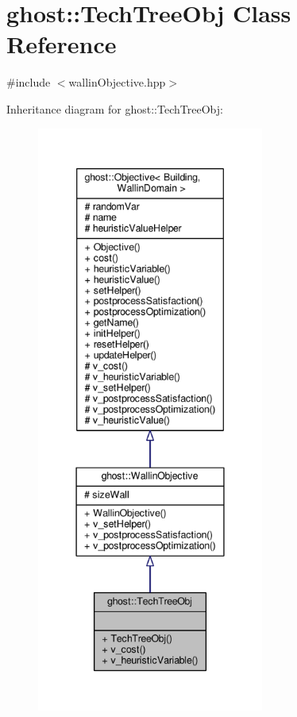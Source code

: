 \hypertarget{classghost_1_1TechTreeObj}{\section{ghost\-:\-:Tech\-Tree\-Obj Class Reference}
\label{classghost_1_1TechTreeObj}
}


{\ttfamily \#include $<$wallin\-Objective.\-hpp$>$}



Inheritance diagram for ghost\-:\-:Tech\-Tree\-Obj\-:\nopagebreak
\begin{figure}[H]
\begin{center}
\leavevmode
\includegraphics[height=550pt]{classghost_1_1TechTreeObj__inherit__graph}
\end{center}
\end{figure}


